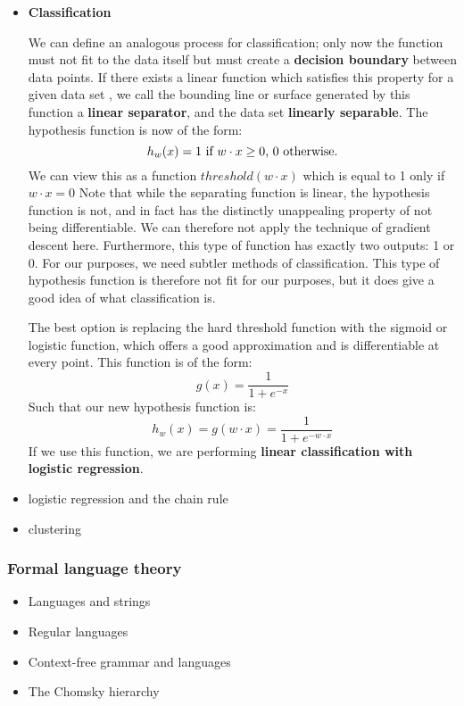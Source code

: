 \begin{itemize}
\item { 
    \textbf{Classification} 

    We can define an analogous process for classification; only now
    the function must not fit to the data itself but must create a
    \textbf{decision boundary} between data points. If there exists a
    linear function which satisfies this property for a given data set
    , we call the bounding line or surface generated by this function a
    \textbf{linear separator}, and the data set \textbf{linearly
      separable}. The hypothesis function is now of the form:
    \begin{equation}
      h_w(x) = 1$ if $ w \cdot x \geq 0$, $0$ otherwise.$
    \end{equation}
    We can view this as a function $threshold(w \cdot x)$ which is
    equal to 1 only if $w \cdot x = 0$ Note that while the separating
    function is linear, the hypothesis function is not, and in fact has
    the distinctly unappealing property of not being differentiable. We
    can therefore not apply the technique of gradient descent
    here. Furthermore, this type of function has exactly two outputs: 1 or
    0. For our purposes, we need subtler methods of classification.  This
    type of hypothesis function is therefore not fit for our purposes, but
    it does give a good idea of what classification is.

    The best option is replacing the hard threshold function with the
    sigmoid or logistic function, which offers a good approximation and is
    differentiable at every point. This function is of the form:
    \begin{equation}
      g(x) = \frac{1}{1 + e^{-x}}
    \end{equation}
    Such that our new hypothesis function is:
    \begin{equation}
      h_w(x) = g(w \cdot x) = \frac{1}{1 + e^{- w \cdot x}}
    \end{equation}
    If we use this function, we are performing \textbf{linear
      classification with logistic regression}.

  }

\item logistic regression and the chain rule
\item clustering
\end{itemize}


\subsubsection{Formal language theory}
\label{sec:formalgrammars}
\begin{itemize}
  \item Languages and strings
  \item Regular languages
  \item Context-free grammar and languages
  \item The Chomsky hierarchy
\end{itemize}

